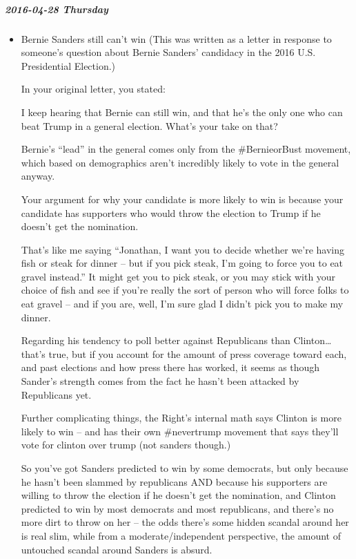 \documentclass[11pt]{article}
\begin{document}
\subparagraph*{2016-04-28 Thursday}
\label{sec:orgc92e6bc}
\begin{itemize}
\item Bernie Sanders still can't win
\label{sec:orgab6df3e}
(This was written as a letter in response to someone's question about Bernie Sanders' candidacy in the 2016 U.S. Presidential Election.)

In your original letter, you stated:

I keep hearing that Bernie can still win, and that he’s the only one who can beat Trump in a general election. What’s your take on that?

Bernie’s “lead” in the general comes only from the \#BernieorBust movement, which based on demographics aren’t incredibly likely to vote in the general anyway.

Your argument for why your candidate is more likely to win is because your candidate has supporters who would throw the election to Trump if he doesn’t get the nomination.

That’s like me saying “Jonathan, I want you to decide whether we’re having fish or steak for dinner – but if you pick steak, I’m going to force you to eat gravel instead.” It might get you to pick steak, or you may stick with your choice of fish and see if you’re really the sort of person who will force folks to eat gravel – and if you are, well, I’m sure glad I didn’t pick you to make my dinner.

Regarding his tendency to poll better against Republicans than Clinton… that’s true, but if you account for the amount of press coverage toward each, and past elections and how press there has worked, it seems as though Sander’s strength comes from the fact he hasn’t been attacked by Republicans yet.

Further complicating things, the Right’s internal math says Clinton is more likely to win – and has their own \#nevertrump movement that says they’ll vote for clinton over trump (not sanders though.)

So you’ve got Sanders predicted to win by some democrats, but only because he hasn’t been slammed by republicans AND because his supporters are willing to throw the election if he doesn’t get the nomination, and Clinton predicted to win by most democrats and most republicans, and there’s no more dirt to throw on her – the odds there’s some hidden scandal around her is real slim, while from a moderate/independent perspective, the amount of untouched scandal around Sanders is absurd.


\end{itemize}
\end{document}
